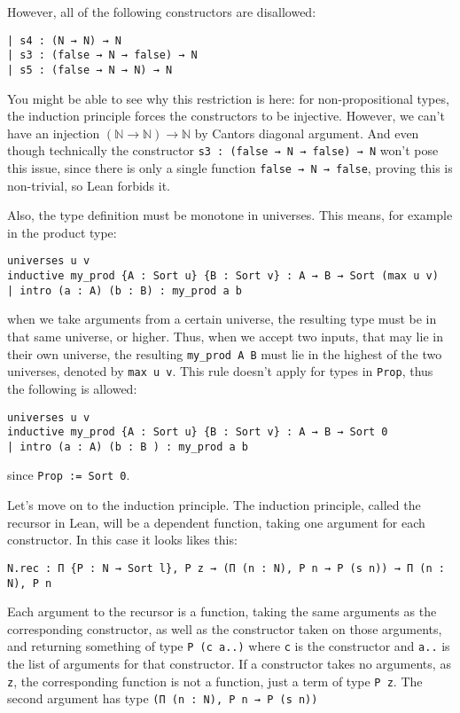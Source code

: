 \documentclass[a4paper, 12pt]{article}
\newcommand{\N}{\mathbb{N}}
\newcommand{\lean}[1]{\texttt{#1}}
\theoremstyle{changedot}
\theoremstyle{changedotbreak}
\theoremstyle{nonumberplain}
\begin{document}
However, all of the following constructors are disallowed:

\begin{verbatim}
| s4 : (N → N) → N
| s3 : (false → N → false) → N
| s5 : (false → N → N) → N
\end{verbatim}

You might be able to see why this restriction is here: for non-propositional types, the induction principle forces the constructors to be injective. However, we can't have an injection $(\N \to \N) \to \N$ by Cantors diagonal argument. And even though technically the constructor \lean{s3 : (false → N → false) → N} won't pose this issue, since there is only a single function \lean{false → N → false}, proving this is non-trivial, so Lean forbids it.

Also, the type definition must be monotone in universes. This means, for example in the product type:

\begin{verbatim}
universes u v
inductive my_prod {A : Sort u} {B : Sort v} : A → B → Sort (max u v)
| intro (a : A) (b : B) : my_prod a b
\end{verbatim}

when we take arguments from a certain universe, the resulting type must be in that same universe, or higher. Thus, when we accept two inputs, that may lie in their own universe, the resulting \lean{my_prod A B} must lie in the highest of the two universes, denoted by \lean{max u v}. This rule doesn't apply for types in \lean{Prop}, thus the following is allowed:

\begin{verbatim}
universes u v
inductive my_prod {A : Sort u} {B : Sort v} : A → B → Sort 0
| intro (a : A) (b : B ) : my_prod a b
\end{verbatim}

since \lean{Prop := Sort 0}.

Let's move on to the induction principle. The induction principle, called the recursor in Lean, will be a dependent function, taking one argument for each constructor. In this case it looks likes this:
\begin{verbatim}
N.rec : Π {P : N → Sort l}, P z → (Π (n : N), P n → P (s n)) → Π (n : N), P n
\end{verbatim}
Each argument to the recursor is a function, taking the same arguments as the corresponding constructor, as well as the constructor taken on those arguments, and returning something of type \lean{P (c a..)} where \lean{c} is the constructor and \lean{a..} is the list of arguments for that constructor. If a constructor takes no arguments, as \lean{z}, the corresponding function is not a function, just a term of type \lean{P z}. The second argument has type \lean{(Π (n : N), P n → P (s n))}
\end{document}
